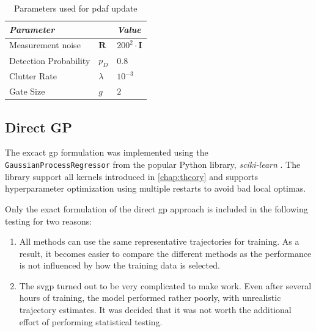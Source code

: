\begin{table}[h]
    \centering
    \begin{tabular}{lll}
        \textit{\textbf{Parameter}} &                  & \textit{\textbf{Value}}      \\ \hline
        Measurement noise           & $\boldsymbol{R}$ & $200^2 \cdot \boldsymbol{I}$ \\
        Detection Probability       & $p_D$            & $0.8$                        \\
        Clutter Rate                & $\lambda$        & $10^{-3}$                    \\
        Gate Size                   & $g$              & $2$
    \end{tabular}
    \caption{Parameters used for \acrshort{pdaf} update}
    \label{table:stats_pdaf_params}
\end{table}


\subsection{Direct GP}
The excact \acrshort{gp} formulation was implemented using the \texttt{GaussianProcessRegressor} from the popular Python library, \textit{sciki-learn} \cite{scikit-learn}. The library support all kernels introduced in \cref{chap:theory} and supports hyperparameter optimization using multiple restarts to avoid bad local optimas.



Only the exact formulation of the direct \acrshort{gp} approach is included in the following testing for two reasons:
\begin{enumerate}
    \item All methods can use the same representative trajectories for training. As a result, it becomes easier to compare the different methods as the performance is not influenced by how the training data is selected.
    \item The \acrshort{svgp} turned out to be very complicated to make work. Even after several hours of training, the model performed rather poorly, with unrealistic trajectory estimates. It was decided that it was not worth the additional effort of performing statistical testing.
\end{enumerate}

